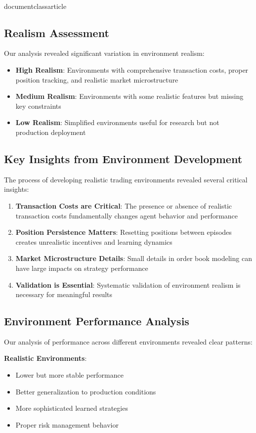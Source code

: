 \\documentclass{article}
\begin{document}
\subsection{Realism Assessment}

Our analysis revealed significant variation in environment realism:

\begin{itemize}
\item \textbf{High Realism}: Environments with comprehensive transaction costs, proper position tracking, and realistic market microstructure
\item \textbf{Medium Realism}: Environments with some realistic features but missing key constraints
\item \textbf{Low Realism}: Simplified environments useful for research but not production deployment
\end{itemize}

\subsection{Key Insights from Environment Development}

The process of developing realistic trading environments revealed several critical insights:

\begin{enumerate}
\item \textbf{Transaction Costs are Critical}: The presence or absence of realistic transaction costs fundamentally changes agent behavior and performance
\item \textbf{Position Persistence Matters}: Resetting positions between episodes creates unrealistic incentives and learning dynamics
\item \textbf{Market Microstructure Details}: Small details in order book modeling can have large impacts on strategy performance
\item \textbf{Validation is Essential}: Systematic validation of environment realism is necessary for meaningful results
\end{enumerate}

\subsection{Environment Performance Analysis}

Our analysis of performance across different environments revealed clear patterns:

\textbf{Realistic Environments}:
\begin{itemize}
\item Lower but more stable performance
\item Better generalization to production conditions
\item More sophisticated learned strategies
\item Proper risk management behavior
\end{itemize}
\end{document}
